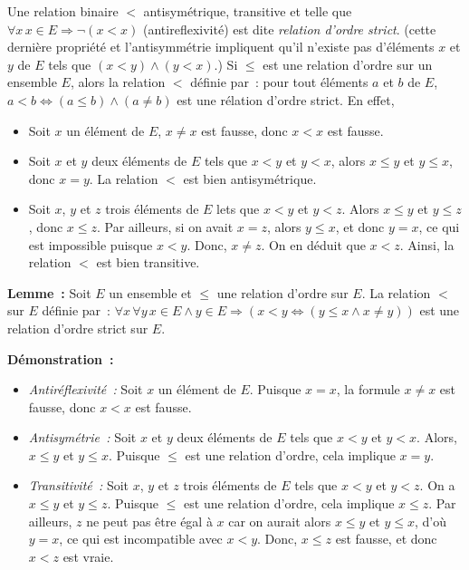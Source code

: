 Une relation binaire $<$ antisymétrique, transitive et telle que $\forall x \, x \in E \Rightarrow \neg (x < x)$ (antireflexivité) est dite \textit{relation d'ordre strict}. 
(cette dernière propriété et l'antisymmétrie impliquent qu'il n'existe pas d'éléments $x$ et $y$ de $E$ tels que $(x < y) \wedge (y < x)$.)
Si $\leq$ est une relation d'ordre sur un ensemble $E$, alors la relation $<$ définie par : pour tout éléments $a$ et $b$ de $E$, $a < b \Leftrightarrow (a \leq b) \wedge (a \neq b)$ est une rélation d'ordre strict.
En effet, 
\begin{itemize}[nosep]
    \item Soit $x$ un élément de $E$, $x \neq x$ est fausse, donc $x < x$ est fausse. 
    \item Soit $x$ et $y$ deux éléments de $E$ tels que $x < y$ et $y < x$, alors $x \leq y$ et $y \leq x$, donc $x = y$. 
        La relation $<$ est bien antisymétrique. 
    \item Soit $x$, $y$ et $z$ trois éléments de $E$ lets que $x < y$ et $y < z$. 
        Alors $x \leq y$ et $y \leq z$, donc $x \leq z$. 
        Par ailleurs, si on avait $x=z$, alors $y \leq x$, et donc $y = x$, ce qui est impossible puisque $x < y$. 
        Donc, $x \neq z$. 
        On en déduit que $x < z$. 
        Ainsi, la relation $<$ est bien transitive.
\end{itemize}

\medskip

\noindent\textbf{Lemme :} Soit $E$ un ensemble et $\leq$ une relation d'ordre sur $E$. 
    La relation $<$ sur $E$ définie par : $\forall x \, \forall y \, x \in E \wedge y \in E \Rightarrow (x < y \Leftrightarrow (y \leq x \wedge x \neq y))$ est une relation d'ordre strict sur $E$. 

\medskip

\noindent\textbf{Démonstration :} 
\begin{itemize}[nosep]
    \item \textit{Antiréflexivité :} Soit $x$ un élément de $E$. 
        Puisque $x = x$, la formule $x \neq x$ est fausse, donc $x < x$ est fausse.
    \item \textit{Antisymétrie :} Soit $x$ et $y$ deux éléments de $E$ tels que $x < y$ et $y < x$. 
        Alors, $x \leq y$ et $y \leq x$. 
        Puisque $\leq$ est une relation d'ordre, cela implique $x = y$.
    \item \textit{Transitivité :} Soit $x$, $y$ et $z$ trois éléments de $E$ tels que $x < y$ et $y < z$. 
        On a $x \leq y$ et $y \leq z$. 
        Puisque $\leq$ est une relation d'ordre, cela implique $x \leq z$. 
        Par ailleurs, $z$ ne peut pas être égal à $x$ car on aurait alors $x \leq y$ et $y \leq x$, d'où $y = x$, ce qui est incompatible avec $x < y$. 
        Donc, $x \leq z$ est fausse, et donc $x < z$ est vraie.
\end{itemize}

